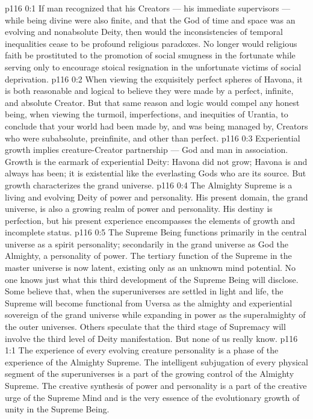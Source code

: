 \author{Mighty Messenger}
\vs p116 0:1 If man recognized that his Creators --- his immediate supervisors --- while being divine were also finite, and that the God of time and space was an evolving and nonabsolute Deity, then would the inconsistencies of temporal inequalities cease to be profound religious paradoxes. No longer would religious faith be prostituted to the promotion of social smugness in the fortunate while serving only to encourage stoical resignation in the unfortunate victims of social deprivation.
\vs p116 0:2 When viewing the exquisitely perfect spheres of Havona, it is both reasonable and logical to believe they were made by a perfect, infinite, and absolute Creator. But that same reason and logic would compel any honest being, when viewing the turmoil, imperfections, and inequities of Urantia, to conclude that your world had been made by, and was being managed by, Creators who were subabsolute, preinfinite, and other than perfect.
\vs p116 0:3 \pc Experiential growth implies creature\hyp{}Creator partnership --- God and man in association. Growth is the earmark of experiential Deity: Havona did not grow; Havona is and always has been; it is existential like the everlasting Gods who are its source. But growth characterizes the grand universe.
\vs p116 0:4 The Almighty Supreme is a living and evolving Deity of power and personality. His present domain, the grand universe, is also a growing realm of power and personality. His destiny is perfection, but his present experience encompasses the elements of growth and incomplete status.
\vs p116 0:5 \pc The Supreme Being functions primarily in the central universe as a spirit personality; secondarily in the grand universe as God the Almighty, a personality of power. The tertiary function of the Supreme in the master universe is now latent, existing only as an unknown mind potential. No one knows just what this third development of the Supreme Being will disclose. Some believe that, when the superuniverses are settled in light and life, the Supreme will become functional from Uversa as the almighty and experiential sovereign of the grand universe while expanding in power as the superalmighty of the outer universes. Others speculate that the third stage of Supremacy will involve the third level of Deity manifestation. But none of us really know.
\vs p116 1:1 The experience of every evolving creature personality is a phase of the experience of the Almighty Supreme. The intelligent subjugation of every physical segment of the superuniverses is a part of the growing control of the Almighty Supreme. The creative synthesis of power and personality is a part of the creative urge of the Supreme Mind and is the very essence of the evolutionary growth of unity in the Supreme Being.

